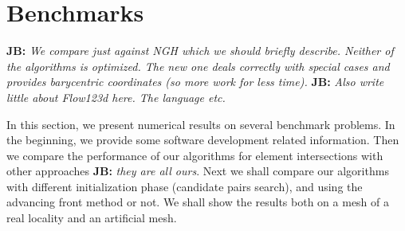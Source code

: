 \documentclass{elsarticle}
\newcommand{\noteJB}[1]{{\color{Blue} \textbf{JB: } \textit{#1}}}
\begin{document}
% 





\section{Benchmarks}
\label{sec:benchmarks}

\noteJB{We compare just against NGH which we should briefly describe. Neither of the algorithms is optimized. The new one deals correctly with special cases and provides 
barycentric coordinates (so more work for less time).}
\noteJB{Also write little about Flow123d here. The language etc.}

In this section, we present numerical results on several benchmark problems. 
In the beginning, we provide some software development related information.
Then we compare the performance of our algorithms for element intersections with other approaches \noteJB{they are all ours}.
Next we shall compare our algorithms with different initialization phase (candidate pairs search),
and using the advancing front method or not. We shall show the results both on a mesh of a real locality
and an artificial mesh.
\end{document}
